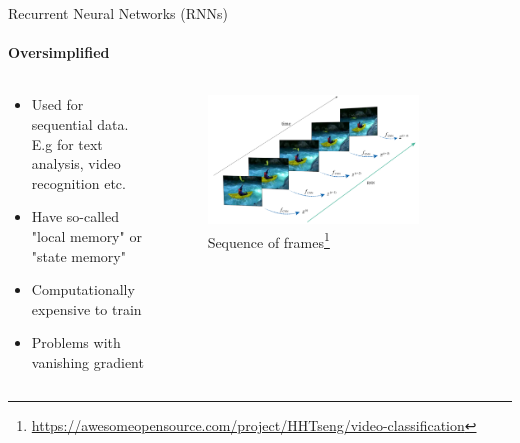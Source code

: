 \documentclass{beamer}
\begin{document}
\begin{frame}{Recurrent Neural Networks (RNNs)}
\framesubtitle{Oversimplified}


\begin{columns}
\begin{column}{0.5\textwidth}
    \begin{itemize}
    \item Used for sequential data. E.g for text analysis, video recognition etc.\pause
    
    \item Have so-called "local memory" or "state memory"\pause

    \item Computationally expensive to train\pause
    
    \item Problems with vanishing gradient\pause
    
    
    \end{itemize}   
\end{column}
\begin{column}{0.5\textwidth}  %
    \begin{figure}
        \centering
        \includegraphics[width=0.8\textwidth]{images/CRNN.png}
        \caption{Sequence of frames\footnote{\url{https://awesomeopensource.com/project/HHTseng/video-classification}}}
    \end{figure}{}
\end{column}
\end{columns}

{}
    
\end{frame}
\end{document}

